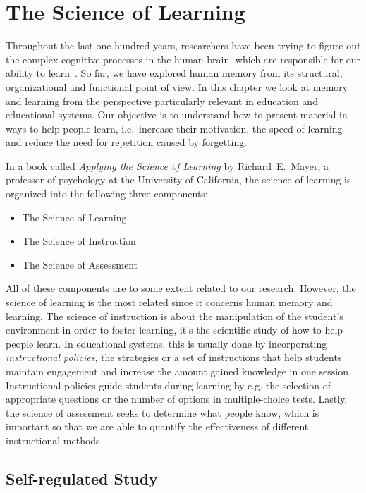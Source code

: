 \section{The Science of Learning}
\label{science-of-learning}

Throughout the last one hundred years, researchers have been trying to figure out the complex cognitive processes in the human brain, which are responsible for our ability to learn~\cite{RichardE.Mayer2010}. So far, we have explored human memory from its structural, organizational and functional point of view. In this chapter we look at memory and learning from the perspective particularly relevant in education and educational systems. Our objective is to understand how to present material in ways to help people learn, i.e.~increase their motivation, the speed of learning and reduce the need for repetition caused by forgetting.

In a book called \textit{Applying the Science of Learning} by Richard~E.~Mayer, a professor of psychology at the University of California, the science of learning is organized into the following three components:

\begin{itemize}
  \item The Science of Learning
  \item The Science of Instruction
  \item The Science of Assessment
\end{itemize}

All of these components are to some extent related to our research. However, the science of learning is the most related since it concerns human memory and learning. The science of instruction is about the manipulation of the student's environment in order to foster learning, it's the scientific study of how to help people learn. In educational systems, this is usually done by incorporating \textit{instructional policies}, the strategies or a set of instructions that help students maintain engagement and increase the amount gained knowledge in one session. Instructional policies guide students during learning by e.g. the selection of appropriate questions or the number of options in multiple-choice tests. Lastly, the science of assessment seeks to determine what people know, which is important so that we are able to quantify the effectiveness of different instructional methods~\cite{RichardE.Mayer2010}.

\subsection{Self-regulated Study}
\label{study}


